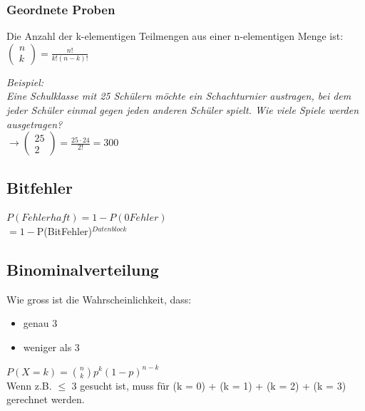 \subsubsection{Geordnete Proben}
Die Anzahl der  k-elementigen Teilmengen aus einer n-elementigen Menge ist:\\
\colorbox{lightlightgrey}{$\left(\begin{array}{c}n \\ k\end{array}\right)=\frac{n !}{k !(n-k) !}$}

\textit{Beispiel:}\\
\textit{Eine Schulklasse mit 25 Schülern möchte ein Schachturnier austragen, bei dem jeder Schüler einmal gegen jeden anderen Schüler spielt. Wie viele Spiele werden ausgetragen?}\\
$\rightarrow \left(\begin{array}{c}25 \\ 2\end{array}\right)=\frac{25 \cdot 24}{2 !}=300$

\subsection{Bitfehler}
\colorbox{lightlightgrey}{$P(Fehlerhaft) = 1 - P(0 Fehler)$}\\
\colorbox{lightlightgrey}{$= 1 - $P(BitFehler)$^{Datenblock}$}



\subsection{Binominalverteilung}
Wie gross ist die Wahrscheinlichkeit, dass:
\begin{itemize}
    \item genau 3
    \item weniger als 3
\end{itemize}
\colorbox{lightlightgrey}{$P(X = k) = \binom{n}{k} p^k(1 - p)^{n-k}$}\\
Wenn z.B. $\le$ 3 gesucht ist, muss für (k = 0) + (k = 1) + (k = 2) + (k = 3) gerechnet werden.

\vfill
$$
\columnbreak